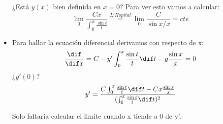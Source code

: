 \documentclass[nochap]{apuntes}
\begin{document}
\begin{problem}[3]
\begin{itemize}
¿Está $y(x)$ bien definida en $x=0$? Para ver esto vamos a calcular:
$$\lim\limits_{0} \frac{Cx}{\int_0^x \frac{\sin t}{t}} \stackrel{L'Hopital}{=} \lim\limits_{0} \frac{C}{\sin x /x} = cte$$ 

\item Para hallar la ecuación diferencial derivamos con respecto de x:
$$\frac{\dif}{\dif x} = C - y' \int_0^x\frac{\sin t}{t} \dif t - y \frac{\sin x}{x} = 0$$
¿$ y'(0)$?
 $$ y' = \frac{C \int_0^x \frac{\sin t}{t} \dif t - Cx\frac{\sin x}{x}}{(\int_0^x \frac{\sin t}{t} \dif t)^2}$$
 
Solo faltaria calcular el limite cuando x tiende a 0 de y'.

\end{itemize}

\end{problem}
\newpage
\end{document}
